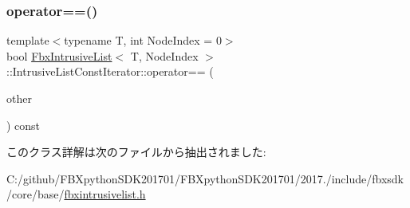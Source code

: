\mbox{\label{class_fbx_intrusive_list_1_1_intrusive_list_const_iterator_a6ad4323602ccebcd92b8df201ccf8c0a}} 
\subsubsection{\texorpdfstring{operator==()}{operator==()}}
{\footnotesize\ttfamily template$<$typename T, int Node\+Index = 0$>$ \\
bool \hyperlink{class_fbx_intrusive_list}{Fbx\+Intrusive\+List}$<$ T, Node\+Index $>$\+::Intrusive\+List\+Const\+Iterator\+::operator== (\begin{DoxyParamCaption}\item[{const \hyperlink{class_fbx_intrusive_list_1_1_intrusive_list_const_iterator}{Intrusive\+List\+Const\+Iterator} \&}]{other }\end{DoxyParamCaption}) const}



このクラス詳解は次のファイルから抽出されました\+:\begin{DoxyCompactItemize}
\item 
C\+:/github/\+F\+B\+Xpython\+S\+D\+K201701/\+F\+B\+Xpython\+S\+D\+K201701/2017./include/fbxsdk/core/base/\hyperlink{fbxintrusivelist_8h}{fbxintrusivelist.\+h}\end{DoxyCompactItemize}
